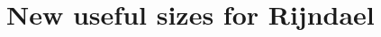 \documentclass[a4paper,twoside]{llncs}
\begin{document}
\section{New useful sizes for Rijndael}
\cite{Daemen:1999:EBC:1267115.1267119}

% 



\end{document}
